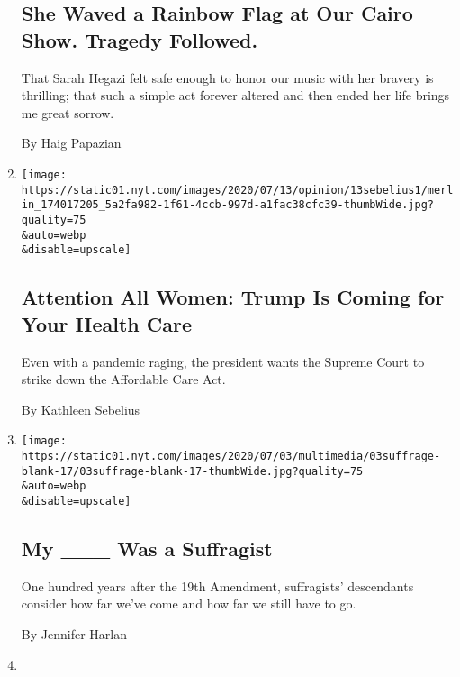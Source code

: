 \begin{enumerate}
  \hypertarget{she-waved-a-rainbow-flag-at-our-cairo-show-tragedy-followed}{%
  \subsection{She Waved a Rainbow Flag at Our Cairo Show. Tragedy
  Followed.}\label{she-waved-a-rainbow-flag-at-our-cairo-show-tragedy-followed}}

  That Sarah Hegazi felt safe enough to honor our music with her bravery
  is thrilling; that such a simple act forever altered and then ended
  her life brings me great sorrow.

  By Haig Papazian
\item
  \href{/2020/07/13/opinion/obamacare-aca-trump-women.html}{}

  \texttt{[image: https://static01.nyt.com/images/2020/07/13/opinion/13sebelius1/merlin\_174017205\_5a2fa982-1f61-4ccb-997d-a1fac38cfc39-thumbWide.jpg?quality=75\\\&auto=webp\\\&disable=upscale]}

  \hypertarget{attention-all-women-trump-is-coming-for-your-health-care}{%
  \subsection{Attention All Women: Trump Is Coming for Your Health
  Care}\label{attention-all-women-trump-is-coming-for-your-health-care}}

  Even with a pandemic raging, the president wants the Supreme Court to
  strike down the Affordable Care Act.

  By Kathleen Sebelius
\item
  \href{/2020/07/02/style/woman-suffrage-movement-descend.html}{}

  \texttt{[image: https://static01.nyt.com/images/2020/07/03/multimedia/03suffrage-blank-17/03suffrage-blank-17-thumbWide.jpg?quality=75\\\&auto=webp\\\&disable=upscale]}

  \hypertarget{my-___-was-a-suffragist}{%
  \subsection{My \_\_\_ Was a
  Suffragist}\label{my-___-was-a-suffragist}}

  One hundred years after the 19th Amendment, suffragists' descendants
  consider how far we've come and how far we still have to go.

  By Jennifer Harlan
\item
  \href{/2020/06/25/arts/nonbinary-comedians-pride-coronavirus.html}{}


\end{enumerate}

